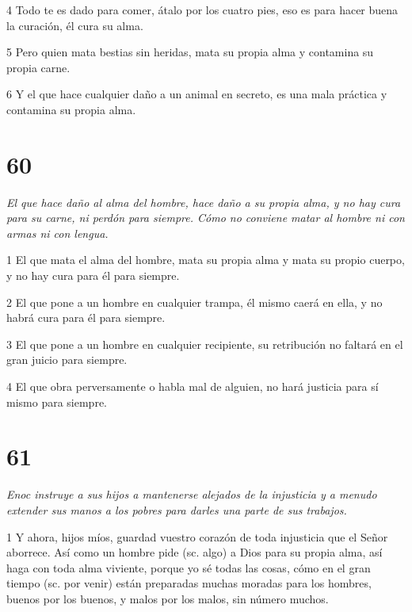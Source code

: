 \par 4 Todo te es dado para comer, átalo por los cuatro pies, eso es para hacer buena la curación, él cura su alma.

\par 5 Pero quien mata bestias sin heridas, mata su propia alma y contamina su propia carne.

\par 6 Y el que hace cualquier daño a un animal en secreto, es una mala práctica y contamina su propia alma.

\chapter{60}

\par \textit{El que hace daño al alma del hombre, hace daño a su propia alma, y ​​no hay cura para su carne, ni perdón para siempre. Cómo no conviene matar al hombre ni con armas ni con lengua.}

\par 1 El que mata el alma del hombre, mata su propia alma y mata su propio cuerpo, y no hay cura para él para siempre.

\par 2 El que pone a un hombre en cualquier trampa, él mismo caerá en ella, y no habrá cura para él para siempre.

\par 3 El que pone a un hombre en cualquier recipiente, su retribución no faltará en el gran juicio para siempre.

\par 4 El que obra perversamente o habla mal de alguien, no hará justicia para sí mismo para siempre.

\chapter{61}

\par \textit{Enoc instruye a sus hijos a mantenerse alejados de la injusticia y a menudo extender sus manos a los pobres para darles una parte de sus trabajos.}

\par 1 Y ahora, hijos míos, guardad vuestro corazón de toda injusticia que el Señor aborrece. Así como un hombre pide (sc. algo) a Dios para su propia alma, así haga con toda alma viviente, porque yo sé todas las cosas, cómo en el gran tiempo (sc. por venir) están preparadas muchas moradas para los hombres, buenos por los buenos, y malos por los malos, sin número muchos.

